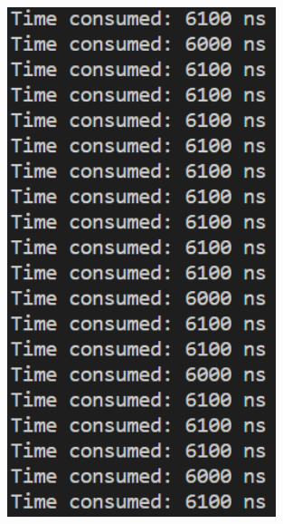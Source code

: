 \documentclass[a4paper,12pt]{article}
\begin{document}
\begin{figure}[H]
{\begin{minipage}[t]{0.4\textwidth}
        \includegraphics[width = 0.7\textwidth]{N = 16000, Asm optimization.png}
    \end{minipage}}
\end{figure}
\end{document}
